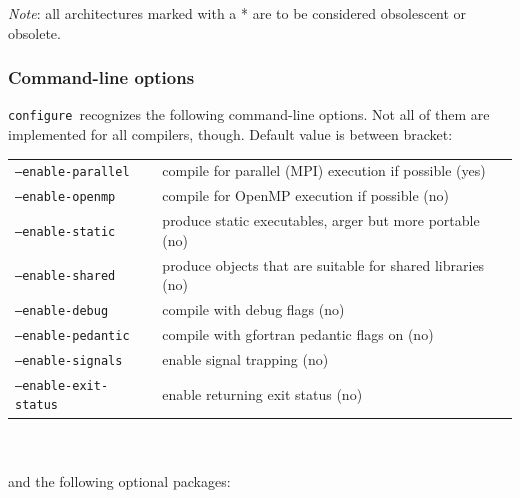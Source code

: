 \documentclass[12pt,a4paper]{article}
\def\configure{\texttt{configure}}
\begin{document}
{\em Note}: all architectures marked with a * are to be considered
obsolescent or obsolete.

\subsubsection{Command-line options}
\configure\ recognizes the following command-line options.
Not all of them are implemented for all compilers, though. Default value
is between bracket:\\
\begin{tabular}{ll}
\texttt{--enable-parallel}&     compile for parallel (MPI) execution if possible (yes)\\
\texttt{--enable-openmp}&       compile for OpenMP execution if possible (no)\\
\texttt{--enable-static}&       produce static executables, arger but more portable (no)\\
\texttt{--enable-shared}&       produce objects that are suitable for shared libraries (no)\\
\texttt{--enable-debug}&        compile with debug flags (no)\\
\texttt{--enable-pedantic}&     compile with gfortran pedantic flags on (no)\\
\texttt{--enable-signals}&      enable signal trapping (no)\\
\texttt{--enable-exit-status}&  enable returning exit status (no)\\
\end{tabular}\\
\\
and the following optional packages:\\
\end{document}
